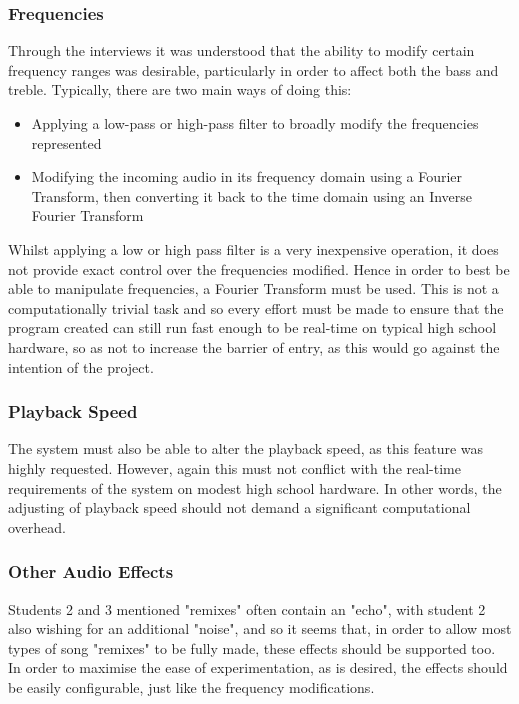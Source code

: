 \subsubsection{Frequencies}
Through the interviews it was understood that the ability to modify certain frequency ranges was desirable, particularly in order to affect both the bass and treble. Typically, there are two main ways of doing this:
\begin{itemize}
	\item Applying a low-pass or high-pass filter to broadly modify the frequencies represented
	\item Modifying the incoming audio in its frequency domain using a Fourier Transform, then converting it back to the time domain using an Inverse Fourier Transform
\end{itemize}
Whilst applying a low or high pass filter is a very inexpensive operation, it does not provide exact control over the frequencies modified. Hence in order to best be able to manipulate frequencies, a Fourier Transform must be used.  This is not a computationally trivial task and so every effort must be made to ensure that the program created can still run fast enough to be real-time on typical high school hardware, so as not to increase the barrier of entry, as this would go against the intention of the project.

\subsubsection{Playback Speed}
The system must also be able to alter the playback speed, as this feature was highly requested. However, again this must not conflict with the real-time requirements of the system on modest high school hardware. In other words, the adjusting of playback speed should not demand a significant computational overhead.

\subsubsection{Other Audio Effects}
Students 2 and 3 mentioned "remixes" often contain an "echo", with student 2 also wishing for an additional "noise", and so it seems that, in order to allow most types of song "remixes" to be fully made, these effects should be supported too. In order to maximise the ease of experimentation, as is desired, the effects should be easily configurable, just like the frequency modifications.

